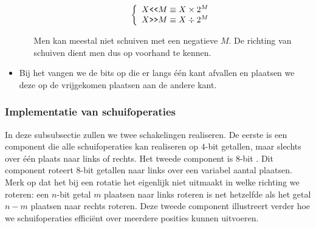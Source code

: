 \begin{itemize}
\begin{itemize}
\begin{equation}
\left\{\begin{array}{l}
X\verb+<<+M\equiv X\times 2^M\\
X\verb+>>+M\equiv X\div 2^M
\end{array}\right.
\end{equation}

Men kan meestal niet schuiven met een negatieve $M$. De richting van schuiven dient men dus op voorhand te kennen.
 \end{itemize}

 \item Bij het  vangen we de bits op die er langs \'e\'en kant afvallen en plaatsen we deze op de vrijgekomen plaatsen aan de andere kant.
\end{itemize}

\subsubsection{Implementatie van schuifoperaties}
In deze subsubsectie zullen we twee schakelingen realiseren. De eerste is een component die alle schuifoperaties kan realiseren op $4$-bit getallen, maar slechts over \'e\'en plaats naar links of rechts. Het tweede component is $8$-bit . Dit component roteert $8$-bit getallen naar links over een variabel aantal plaatsen. Merk op dat het bij een rotatie het eigenlijk niet uitmaakt in welke richting we roteren: een $n$-bit getal $m$ plaatsen naar links roteren is net hetzelfde als het getal $n-m$ plaatsen naar rechts roteren. Deze tweede component illustreert verder hoe we schuifoperaties effici\"ent over meerdere posities kunnen uitvoeren.

